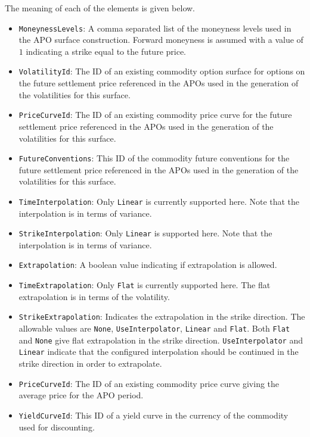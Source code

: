 The meaning of each of the elements is given below.
\begin{itemize}
\item \lstinline!MoneynessLevels!:
A comma separated list of the moneyness levels used in the APO surface construction. Forward moneyness is assumed with a value of $1$ indicating a strike equal to the future price.

\item \lstinline!VolatilityId!:
The ID of an existing commodity option surface for options on the future settlement price referenced in the APOs used in the generation of the volatilities for this surface.

\item \lstinline!PriceCurveId!:
The ID of an existing commodity price curve for the future settlement price referenced in the APOs used in the generation of the volatilities for this surface.

\item \lstinline!FutureConventions!:
This ID of the commodity future conventions for the future settlement price referenced in the APOs used in the generation of the volatilities for this surface.

\item \lstinline!TimeInterpolation!:
Only \lstinline!Linear! is currently supported here. Note that the interpolation is in terms of variance.

\item \lstinline!StrikeInterpolation!:
Only \lstinline!Linear! is supported here. Note that the interpolation is in terms of variance.

\item \lstinline!Extrapolation!:
A boolean value indicating if extrapolation is allowed.

\item \lstinline!TimeExtrapolation!:
Only \lstinline!Flat! is currently supported here. The flat extrapolation is in terms of the volatility.

\item \lstinline!StrikeExtrapolation!:
Indicates the extrapolation in the strike direction. The allowable values are \lstinline!None!, \lstinline!UseInterpolator!, \lstinline!Linear! and \lstinline!Flat!. Both \lstinline!Flat! and \lstinline!None! give flat extrapolation in the strike direction. \lstinline!UseInterpolator! and \lstinline!Linear! indicate that the configured interpolation should be continued in the strike direction in order to extrapolate.

\item \lstinline!PriceCurveId!:
The ID of an existing commodity price curve giving the average price for the APO period.

\item \lstinline!YieldCurveId!:
This ID of a yield curve in the currency of the commodity used for discounting.

\end{itemize}